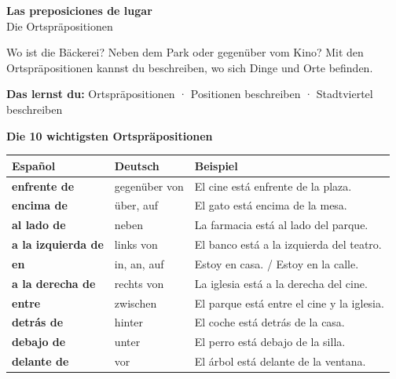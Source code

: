 \documentclass[11pt, a4paper]{article}
\newcommand{\seriftext}[1]{{\fontfamily{ppl}\selectfont #1}}
\newcommand{\thema}{Las preposiciones de lugar}
\newcommand{\untertitel}{Die Ortspräpositionen}
\newcommand{\lernziele}{10 Ortspräpositionen · Positionen beschreiben · Stadtviertel beschreiben}
\newcommand{\es}[1]{\seriftext{\textbf{#1}}}
\begin{document}
\begin{center}
    {\LARGE\bfseries \thema}\\[3pt]
    {\small \untertitel}
\end{center}

\vspace{4pt}

Wo ist die Bäckerei? Neben dem Park oder gegenüber vom Kino?
Mit den Ortspräpositionen kannst du beschreiben, wo sich Dinge und Orte befinden.

\vspace{2pt}

\begin{lernzielbox}
\textbf{Das lernst du:}\quad \lernziele
\end{lernzielbox}


\begin{merkbox}
\textbf{Die 10 wichtigsten Ortspräpositionen}

\vspace{6pt}

\begin{center}
\renewcommand{\arraystretch}{1.4}
\begin{tabular}{|l|l|l|}
\hline
\textbf{Español} & \textbf{Deutsch} & \textbf{Beispiel} \\
\hline
\es{enfrente de} & gegenüber von & El cine está enfrente de la plaza. \\
\hline
\es{encima de} & über, auf & El gato está encima de la mesa. \\
\hline
\es{al lado de} & neben & La farmacia está al lado del parque. \\
\hline
\es{a la izquierda de} & links von & El banco está a la izquierda del teatro. \\
\hline
\es{en} & in, an, auf & Estoy en casa. / Estoy en la calle. \\
\hline
\es{a la derecha de} & rechts von & La iglesia está a la derecha del cine. \\
\hline
\es{entre} & zwischen & El parque está entre el cine y la iglesia. \\
\hline
\es{detrás de} & hinter & El coche está detrás de la casa. \\
\hline
\es{debajo de} & unter & El perro está debajo de la silla. \\
\hline
\es{delante de} & vor & El árbol está delante de la ventana. \\
\hline
\end{tabular}
\end{center}
\end{merkbox}
\end{document}
